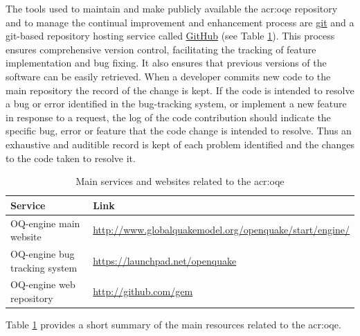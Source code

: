The tools used to maintain and make publicly available the \gls{acr:oqe}
repository and to manage the continual improvement and enhancement process are
\href{http://git-scm.com/}{git} and a git-based repository hosting service
called \href{http://github.com/}{GitHub} (see Table
\ref{tab:development_tools}). 
This process ensures comprehensive version control, facilitating the tracking of
feature implementation and bug fixing. It also ensures that previous versions of
the software can be easily retrieved.  When a developer commits new code to the
main repository the record of the change is kept. If the code is intended to
resolve a bug or error identified in the bug-tracking system, or implement a new
feature in response to a request, the log of the code contribution should
indicate the specific bug, error or feature that the code change is intended to
resolve. 
%
Thus an exhaustive and auditible record is kept of each problem
identified and the changes to the code taken to resolve it.
%
\begin{table}[!t]
\centering
\caption{Main services and websites related to the \gls{acr:oqe}}
\begin{tabular}{p{4cm}p{9cm}}
\hline
\rowcolor{anti-flashwhite}
\bf{Service} & \bf{Link}  \\
\hline 
OQ-engine main website & 
    \href{http://www.globalquakemodel.org/openquake/start/engine/}
        {http://www.globalquakemodel.org/openquake/start/engine/} \\
OQ-engine bug tracking system & 
    \href{https://launchpad.net/openquake}{https://launchpad.net/openquake} \\
OQ-engine web repository & 
    \href{http://github.com/gem}{http://github.com/gem} \\
\hline
\end{tabular}
\label{tab:development_tools}
\end{table}
Table \ref{tab:development_tools} provides a short summary of the main 
resources related to the \gls{acr:oqe}.
%
